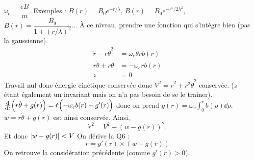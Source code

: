 \begin{solution}
    \begin{questions}
        \questioncours $\omega_\text{c} = \dfrac{eB}{m}$.
        \question Exemples : $B(r) = B_0 e^{-r/\lambda}$, $B(r) = B_0 e^{-r^2/2\lambda^2}$, $B(r) = \dfrac{B_0}{1+(r/\lambda)^2}$... \`A ce niveau, prendre une fonction qui s'intègre bien (pas la gaussienne).
        \question \begin{align*}
            \ddot{r} - r \dot{\theta}^2 &= \omega_c \dot{\theta} r b(r) \\
            r\ddot{\theta} + \dot{r}\dot{\theta} &= -\omega_c \dot{r} b(r) \\
            \ddot{z} &= 0
        \end{align*}
        \question Travail nul donc énergie cinétique conservée donc $V^2 = \dot{r}^2 + r^2\dot{\theta}^2$ conservée. ($\dot{z}$ étant également un invariant mais on n'a pas besoin de se le trainer).
        \question $\dv{t} \qty\Big(r\dot{\theta} + g(r)) = \dot{r}\qty\Big( -\omega_c b(r) + g'(r))$ donc on prend $g(r) = \omega_c \int_0^r b(\rho)\dd{\rho}$. $w = r\dot{\theta} + g(r)$ est ainsi conservée.
        \question Ainsi,
        $$\dot{r}^2 = V^2 - (w - g(r))^2.$$
        \question
        Et donc  $\abs{w - g(r)} < V$
        \question On dérive la Q6 :
        $$\ddot{r} = g'(r)\times(w-g(r))$$
        On retrouve la considération précédente (comme $g'(r)>0$).
    \end{questions}
\end{solution}